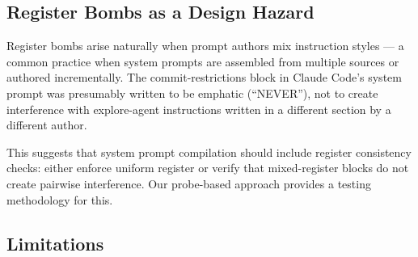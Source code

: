 \documentclass[11pt,a4paper]{article}
\begin{document}
\subsection{Register Bombs as a Design Hazard}

Register bombs arise naturally when prompt authors mix instruction
styles --- a common practice when system prompts are assembled from
multiple sources or authored incrementally. The commit-restrictions
block in Claude Code's system prompt was presumably written to be
emphatic (``NEVER''), not to create interference with explore-agent
instructions written in a different section by a different author.

This suggests that system prompt compilation should include register
consistency checks: either enforce uniform register or verify that
mixed-register blocks do not create pairwise interference. Our
probe-based approach provides a testing methodology for this.

\subsection{Limitations}
\end{document}
